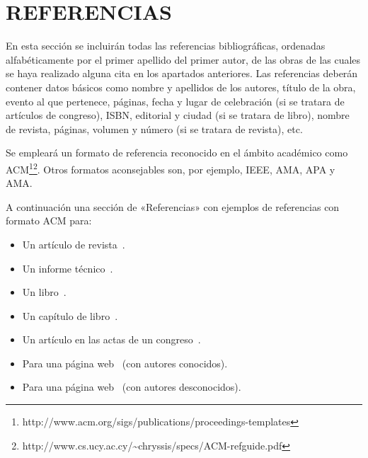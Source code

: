 \documentclass{pre-tfg}
\begin{document}
\section{REFERENCIAS}

En esta sección se incluirán todas las referencias bibliográficas, ordenadas
alfabéticamente por el primer apellido del primer autor, de las obras de las cuales se
haya realizado alguna cita en los apartados anteriores. Las referencias deberán contener
datos básicos como nombre y apellidos de los autores, título de la obra, evento al que
pertenece, páginas, fecha y lugar de celebración (si se tratara de artículos de congreso),
ISBN, editorial y ciudad (si se tratara de libro), nombre de revista, páginas, volumen y
número (si se tratara de revista), etc.

Se empleará un formato de referencia reconocido en el ámbito académico como
ACM\footnote{http://www.acm.org/sigs/publications/proceedings-templates}\footnote{http://www.cs.ucy.ac.cy/\~{}chryssis/specs/ACM-refguide.pdf}.
Otros formatos aconsejables son, por ejemplo, IEEE, AMA, APA y AMA.

A continuación una sección de «Referencias» con ejemplos de referencias con formato ACM para:

\begin{itemize}
\item Un artículo de revista~\cite{Bow93}.
\item Un informe técnico~\cite{Ding97}.
\item Un libro~\cite{Tavel07}.
\item Un capítulo de libro~\cite{Greiner99}.
\item Un artículo en las actas de un congreso~\cite{Frohlic00}.
\item Para una página web~\cite{Steele04} (con autores conocidos).
\item Para una página web~\cite{Oxygen} (con autores desconocidos).
\end{itemize}



\singlespacing

\end{document}
